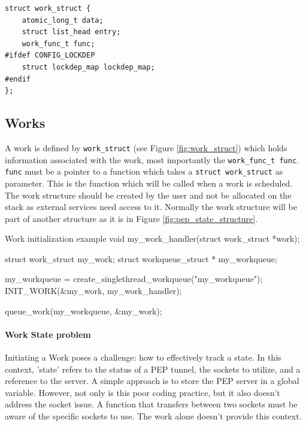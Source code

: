 \documentclass[a4paper,english, 11pt]{report}
\begin{document}
\noindent\begin{minipage}{\linewidth}
\begin{verbatim}
struct work_struct {
    atomic_long_t data;
    struct list_head entry;
    work_func_t func;
#ifdef CONFIG_LOCKDEP
    struct lockdep_map lockdep_map;
#endif
};
\end{verbatim}
\label{fig:work_struct}
\end{minipage}

\subsection{Works}
A work is defined by \verb|work_struct| (see Figure \ref{fig:work_struct}) which holds information associated with the work, most importantly the \verb|work_func_t func|. \verb|func| must be a pointer to a function which takes a \verb|struct work_struct| as parameter. This is the function which will be called when a work is scheduled. The work structure should be created by the user and not be allocated on the stack as external services need access to it. Normally the work structure will be part of another structure as it is in Figure \ref{fig:pep_state_structure}.\\


\begin{autonumlstlisting}[label=lst:work_init]{Work initialization example}
void my_work_handler(struct work_struct *work);

struct work_struct my_work;
struct workqueue_struct * my_workqueue;

my_workqueue = create_singlethread_workqueue("my_workqueue");
INIT_WORK(&my_work, my_work_handler);

queue_work(my_workqueue, &my_work);
\end{autonumlstlisting}

\paragraph{Work State problem}
Initiating a Work poses a challenge: how to effectively track a state. In this context, 'state' refers to the status of a PEP tunnel, the sockets to utilize, and a reference to the server. A simple approach is to store the PEP server in a global variable. However, not only is this poor coding practice, but it also doesn't address the socket issue. A function that transfers between two sockets must be aware of the specific sockets to use. The work alone doesn't provide this context.\\
\end{document}
